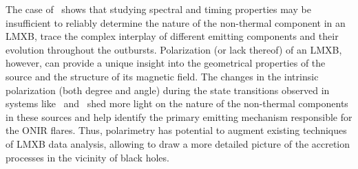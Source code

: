 The case of \GX\ shows that studying spectral and timing properties may be insufficient to reliably determine the nature of the non-thermal component in an \gls{LMXB}, trace the complex interplay of different emitting components and their evolution throughout the outbursts.
Polarization (or lack thereof) of an \gls{LMXB}, however, can provide a unique insight into the geometrical properties of the source and the structure of its magnetic field.
The changes in the intrinsic polarization (both degree and angle) during the state transitions observed in systems like \VCYG\ and \MAXI\ shed more light on the nature of the non-thermal components in these sources and help identify the primary emitting mechanism responsible for the \gls{ONIR} flares.
Thus, polarimetry has potential to augment existing techniques of \gls{LMXB} data analysis, allowing to draw a more detailed picture of the accretion processes in the vicinity of black holes.



